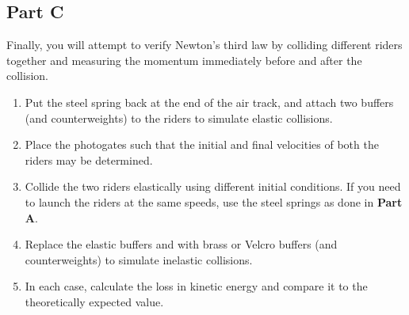 \subsection*{Part C}

Finally, you will attempt to verify Newton's third law by colliding different riders together and measuring the momentum immediately before and after the collision.

\begin{enumerate}
    \item Put the steel spring back at the end of the air track, and attach two buffers (and counterweights) to the riders to simulate elastic collisions.
    
    \item Place the photogates such that the initial and final velocities of both the riders may be determined.
    
    \item Collide the two riders elastically using different initial conditions. If you need to launch the riders at the same speeds, use the steel springs as done in \textbf{Part A}.
    
    \item Replace the elastic buffers and with brass or Velcro buffers (and counterweights) to simulate inelastic collisions.
    
    \item In each case, calculate the loss in kinetic energy and compare it to the theoretically expected value.
\end{enumerate}